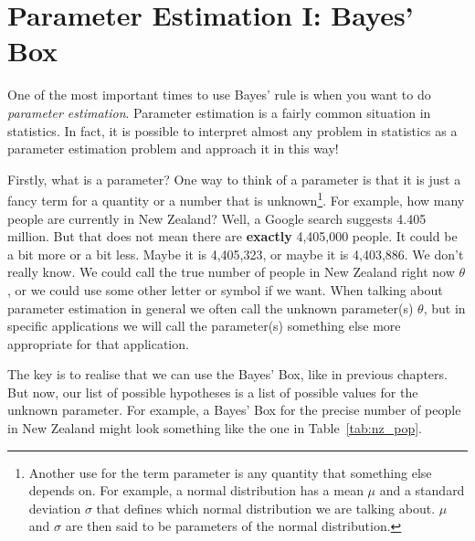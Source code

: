 \chapter{Parameter Estimation I: Bayes' Box}
One of the most important times to use Bayes' rule is when you want to do
{\it parameter estimation}. Parameter estimation is a fairly common
situation in statistics. In fact, it is possible to interpret almost any
problem in statistics as a parameter estimation problem and approach it
in this way!

Firstly, what is a parameter? One way to think of a parameter is that
it is just a fancy term for a quantity or a number that is
unknown\footnote{Another use for the term parameter
is any quantity that something else depends on. For example, a normal distribution
has a mean $\mu$ and a standard deviation $\sigma$ that defines which normal
distribution we are talking about. $\mu$ and $\sigma$ are then said to be
parameters of the normal distribution.}.
For example, how many people are currently in New
Zealand? Well, a Google search suggests 4.405 million. But that does not mean
there are {\bf exactly} 4,405,000 people. It could be a bit more or a bit
less. Maybe it is 4,405,323, or maybe it is 4,403,886. We don't really know.
We could call the true number of people in New Zealand right now $\theta$, or
we could use some other letter or symbol if we want. When talking about
parameter estimation in general we often call the unknown parameter(s)
$\theta$, but in specific applications we will call the parameter(s) something
else more appropriate for that application.

The key is to realise that we can use the Bayes' Box, like in previous chapters.
But now, our list of possible hypotheses is a list of possible values for
the unknown parameter. For example, a Bayes' Box for the precise number of
people in New Zealand might look something like the one in
Table~\ref{tab:nz_pop}.

